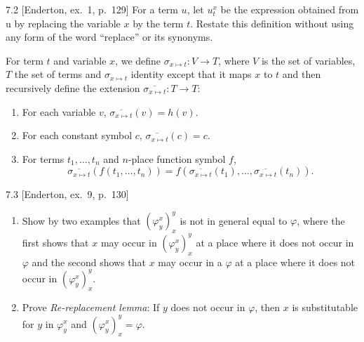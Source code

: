 \begin{exercise}{7.2}
  [Enderton, ex.~1, p.~129]
  For a term $u$, let $u_t^x$ be the expression obtained from u by replacing the variable $x$ by the term $t$. Restate this definition without using any form of the word “replace” or its synonyms.
\end{exercise}

For term $t$ and variable $x$, we define $\sigma_{x\mapsto t}:V\rightarrow T$, where $V$ is the set of variables, $T$ the set of terms and $\sigma_{x\mapsto t}$ identity except that it maps $x$ to $t$ and then recursively define the extension $\overline{\sigma_{x\mapsto t}}:T\rightarrow T$:
\begin{enumerate}
  \item For each variable $v$, $\overline{\sigma_{x\mapsto t}}(v)=h(v)$.
  \item For each constant symbol $c$, $\overline{\sigma_{x\mapsto t}}(c)=c$.
  \item For terms $t_1,\dots,t_n$ and $n$-place function symbol $f$,
        \[\overline{\sigma_{x\mapsto t}}(f(t_1,\dots,t_n))=f(\overline{\sigma_{x\mapsto t}}(t_1),\dots,\overline{\sigma_{x\mapsto t}}(t_n)).\]
\end{enumerate}

\begin{exercise}{7.3}
  [Enderton, ex.~9, p.~130]
  \begin{enumerate}[label=(\alph*)]
    \item Show by two examples that $(\varphi_y^x)_x^y$ is not in general equal to $\varphi$, where the first shows that $x$ may occur in $(\varphi_y^x)_x^y$ at a place where it does not occur in $\varphi$ and the second shows that $x$ may occur in a $\varphi$ at a place where it does not occur in $(\varphi_y^x)_x^y$.
    \item Prove \textit{Re-replacement lemma}: If $y$ does not occur in $\varphi$, then $x$ is substitutable for $y$ in $\varphi_y^x$ and $(\varphi_y^x)_x^y=\varphi$.\qedhere
  \end{enumerate}
\end{exercise}

